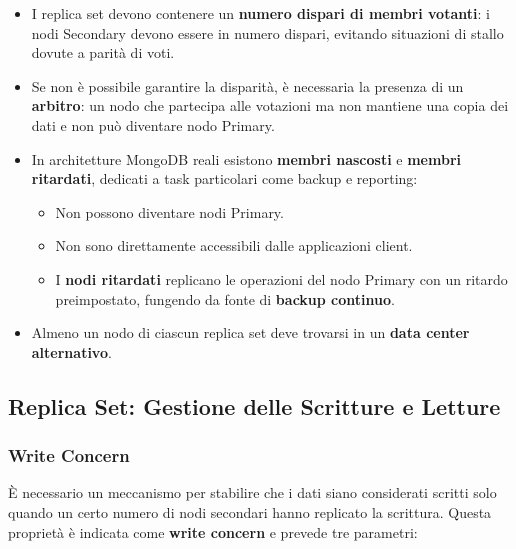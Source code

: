 \begin{itemize}
	\item I replica set devono contenere un \textbf{numero dispari di membri votanti}: i nodi Secondary devono essere in numero dispari, evitando situazioni di stallo dovute a parità di voti.
	
	\item Se non è possibile garantire la disparità, è necessaria la presenza di un \textbf{arbitro}: un nodo che partecipa alle votazioni ma non mantiene una copia dei dati e non può diventare nodo Primary.
	
	\item In architetture MongoDB reali esistono \textbf{membri nascosti} e \textbf{membri ritardati}, dedicati a task particolari come backup e reporting:
	\begin{itemize}
		\item Non possono diventare nodi Primary.
		\item Non sono direttamente accessibili dalle applicazioni client.
		\item I \textbf{nodi ritardati} replicano le operazioni del nodo Primary con un ritardo preimpostato, fungendo da fonte di \textbf{backup continuo}.
	\end{itemize}
	
	\item Almeno un nodo di ciascun replica set deve trovarsi in un \textbf{data center alternativo}.
\end{itemize}
\subsection{Replica Set: Gestione delle Scritture e Letture}

\subsubsection*{Write Concern}

È necessario un meccanismo per stabilire che i dati siano considerati scritti solo quando un certo numero di nodi secondari hanno replicato la scrittura. Questa proprietà è indicata come \textbf{write concern} e prevede tre parametri:

